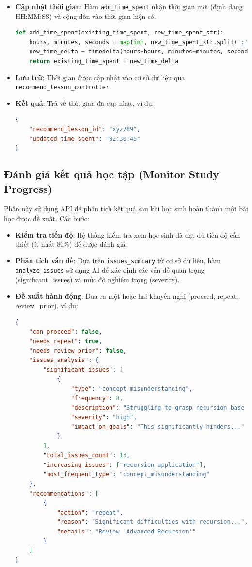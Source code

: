 \begin{itemize}
    \item \textbf{Cập nhật thời gian}: Hàm \texttt{add\_time\_spent} nhận thời gian mới (định dạng HH:MM:SS) và cộng dồn vào thời gian hiện có.
    \begin{lstlisting}[language=Python]
def add_time_spent(existing_time_spent, new_time_spent_str):
    hours, minutes, seconds = map(int, new_time_spent_str.split(':'))
    new_time_delta = timedelta(hours=hours, minutes=minutes, seconds=seconds)
    return existing_time_spent + new_time_delta
    \end{lstlisting}
    \item \textbf{Lưu trữ}: Thời gian được cập nhật vào cơ sở dữ liệu qua \texttt{recommend\_lesson\_controller}.
    \item \textbf{Kết quả}: Trả về thời gian đã cập nhật, ví dụ:
    \begin{lstlisting}[language=JSON]
{
    "recommend_lesson_id": "xyz789",
    "updated_time_spent": "02:30:45"
}
\end{lstlisting}
\end{itemize}

\subsection{Đánh giá kết quả học tập (Monitor Study Progress)}
Phần này sử dụng API để phân tích kết quả sau khi học sinh hoàn thành một bài học được đề xuất. Các bước:
\begin{itemize}
    \item \textbf{Kiểm tra tiến độ}: Hệ thống kiểm tra xem học sinh đã đạt đủ tiến độ cần thiết (ít nhất 80\%) để được đánh giá.
    \item \textbf{Phân tích vấn đề}: Dựa trên \texttt{issues\_summary} từ cơ sở dữ liệu, hàm \texttt{analyze\_issues} sử dụng AI để xác định các vấn đề quan trọng (significant\_issues) và mức độ nghiêm trọng (severity).
    \item \textbf{Đề xuất hành động}: Đưa ra một hoặc hai khuyến nghị (proceed, repeat, review\_prior), ví dụ:
    \begin{lstlisting}[language=JSON]
{
    "can_proceed": false,
    "needs_repeat": true,
    "needs_review_prior": false,
    "issues_analysis": {
        "significant_issues": [
            {
                "type": "concept_misunderstanding",
                "frequency": 8,
                "description": "Struggling to grasp recursion base cases.",
                "severity": "high",
                "impact_on_goals": "This significantly hinders..."
            }
        ],
        "total_issues_count": 13,
        "increasing_issues": ["recursion application"],
        "most_frequent_type": "concept_misunderstanding"
    },
    "recommendations": [
        {
            "action": "repeat",
            "reason": "Significant difficulties with recursion...",
            "details": "Review 'Advanced Recursion'"
        }
    ]
}
    \end{lstlisting}
\end{itemize}

